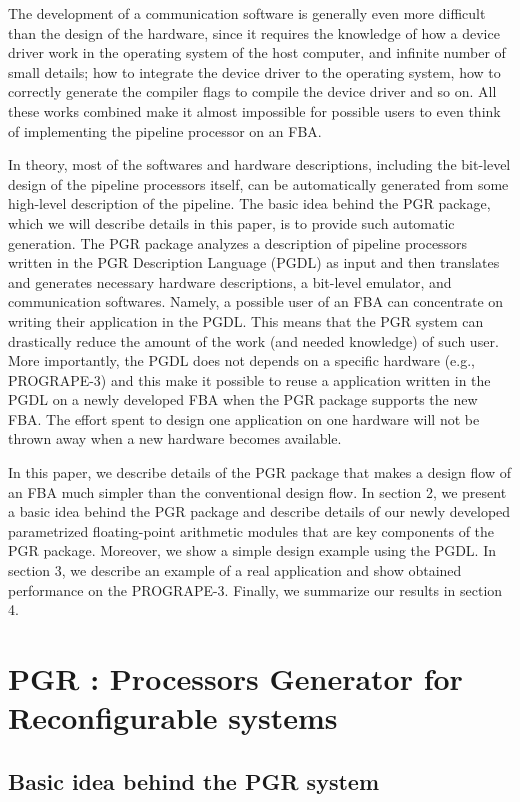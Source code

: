 \documentclass{llncs}
\begin{document}
The development of a communication software is generally even more
difficult than the design of the hardware, since it requires the
knowledge of how a device driver work in the operating
system of the host computer, and infinite number of small details;
how to integrate the device driver to the operating system, how to
correctly generate the compiler flags to compile the device driver and so on.
All these works combined make it almost impossible 
for possible users to even think of implementing the pipeline processor on an FBA.

In theory, most of the softwares and hardware descriptions,
including the bit-level design of the pipeline processors itself,
can be automatically generated from some high-level description of the
pipeline. The basic idea behind the PGR package,
which we will describe details in this paper,
is to provide such automatic generation.
The PGR package analyzes a description of pipeline processors
written in the PGR Description Language (PGDL) as input
and then translates and generates necessary hardware descriptions, 
a bit-level emulator, and communication softwares.
Namely, a possible user of an FBA can concentrate on writing their
application in the PGDL.
This means that the PGR system can drastically reduce the amount of
the work (and needed knowledge) of such user.
More importantly, the PGDL does not depends on a specific hardware
(e.g., PROGRAPE-3) and this make it possible to
reuse a application written in the PGDL on a newly developed FBA
when the PGR package supports the new FBA.
The effort spent to design one application on
one hardware will not be thrown away when a new hardware becomes available.

In this paper, we describe details of the PGR package
that makes a design flow of an FBA much simpler than
the conventional design flow.
In section 2, we present a basic idea behind the PGR package
and describe details of our newly developed parametrized 
floating-point arithmetic modules that are key components of the PGR package.
Moreover, we show a simple design example using the PGDL.
In section 3, we describe an example of a real application 
and show obtained performance on the PROGRAPE-3.
Finally, we summarize our results in section 4.
%
\section{PGR : Processors Generator for Reconfigurable systems}
\subsection{Basic idea behind the PGR system}
\end{document}
